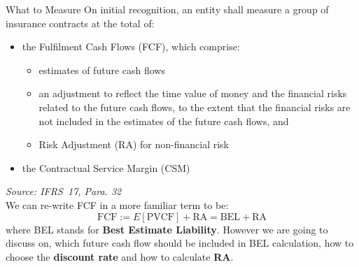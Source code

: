 \documentclass[aspectratio=169]{beamer}
\begin{document}
\begin{frame}{What to Measure}
On initial recognition, an entity shall measure a group of insurance contracts at the total of: 
\begin{itemize}
\item the Fulfilment Cash Flows (FCF), which comprise: 
\begin{itemize}
  \item estimates of future cash flows
  \item an adjustment to reflect the time value of money and the financial risks related to the future cash flows, to the extent that the financial risks are not included in the estimates of the future cash flows, and
  \item Risk Adjustment (RA) for non-financial risk
\end{itemize}
\item the Contractual Service Margin (CSM)
\end{itemize}
\footnotesize
\textit{Source: IFRS~17, Para. 32} \\
\normalsize
We can re-write FCF in a more familiar term to be:
\begin{equation}
  \text{FCF} := E\left[\text{PVCF}\right] + \text{RA} = \text{BEL} + \text{RA}
\end{equation}
where BEL stands for \textbf{Best Estimate Liability}. However we are going to discuss on, which future cash flow should be included in BEL calculation, how to choose the \textbf{discount rate} and how to calculate \textbf{RA}.
\end{frame}
\end{document}
